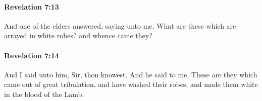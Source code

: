 		\paragraph{Revelation 7:13} %
			\label{REVELATIONNT-7-13}

			And one of the elders answered, saying unto me, What are these which are arrayed in white robes? and whence came they?

			\begin{framed}
			\scriptsize
				\begin{compactdesc}
					\item[SBLG] 
				\end{compactdesc}
			\end{framed}

		\paragraph{Revelation 7:14} %
			\label{REVELATIONNT-7-14}

			And I said unto him, Sir, thou knowest. And he said to me, These are they which came out of great tribulation, and have washed their robes, and made them white in the blood of the Lamb.

